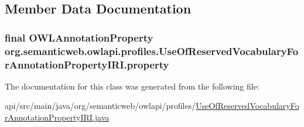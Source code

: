 \subsection{Member Data Documentation}
\hypertarget{classorg_1_1semanticweb_1_1owlapi_1_1profiles_1_1_use_of_reserved_vocabulary_for_annotation_property_i_r_i_ac7dd6689c9e916059fd1ee459944aa87}{
\subsubsection[{property}]{\setlength{\rightskip}{0pt plus 5cm}final {\bf O\-W\-L\-Annotation\-Property} org.\-semanticweb.\-owlapi.\-profiles.\-Use\-Of\-Reserved\-Vocabulary\-For\-Annotation\-Property\-I\-R\-I.\-property\hspace{0.3cm}{\ttfamily [private]}}}\label{classorg_1_1semanticweb_1_1owlapi_1_1profiles_1_1_use_of_reserved_vocabulary_for_annotation_property_i_r_i_ac7dd6689c9e916059fd1ee459944aa87}


The documentation for this class was generated from the following file\-:\begin{DoxyCompactItemize}
\item 
api/src/main/java/org/semanticweb/owlapi/profiles/\hyperlink{_use_of_reserved_vocabulary_for_annotation_property_i_r_i_8java}{Use\-Of\-Reserved\-Vocabulary\-For\-Annotation\-Property\-I\-R\-I.\-java}\end{DoxyCompactItemize}
